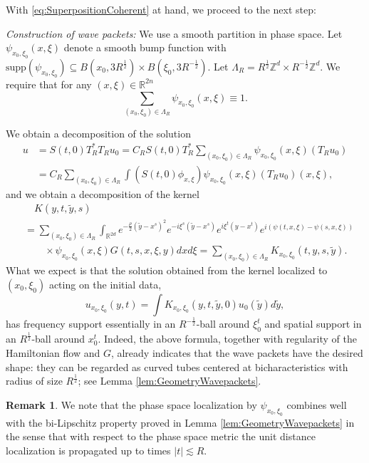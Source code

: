 \documentclass{amsart}
\theoremstyle{definition}
\newtheorem{remark}[theorem]{Remark}
\newcommand{\R}{\mathbb{R}}
\newcommand{\Z}{\mathbb{Z}}
\begin{document}
\smallskip

With \eqref{eq:SuperpositionCoherent} at hand, we proceed to the next step:

\medskip

\emph{Construction of wave packets:} We use a smooth partition in phase space. Let $\psi_{x_0,\xi_0}(x,\xi)$ denote a smooth bump function with $\text{supp}(\psi_{x_0,\xi_0}) \subseteq B(x_0,3 R^{\frac{1}{2}}) \times B(\xi_0,3 R^{-\frac{1}{2}})$.
Let $\Lambda_{R} = R^{\frac{1}{2}} \Z^d \times R^{-\frac{1}{2}} \Z^d$. We require that for any $(x,\xi) \in \R^{2n}$
\begin{equation*}
\sum_{(x_0,\xi_0) \in \Lambda_R} \psi_{x_0,\xi_0}(x,\xi) \equiv 1.
\end{equation*}

We obtain a decomposition of the solution
\begin{equation*}
\begin{split}
u &= S(t,0) T_R^* T_R u_0 = C_R S(t,0) T_R^* \sum_{(x_0,\xi_0) \in \Lambda_R} \psi_{x_0,\xi_0}(x,\xi) ( T_R u_0 ) \\
&= C_R \sum_{(x_0,\xi_0) \in \Lambda_R} \int (S(t,0) \phi_{x,\xi}) \psi_{x_0,\xi_0}(x,\xi) (T_R u_0)(x,\xi),
\end{split}
\end{equation*}
and we obtain a decomposition of the kernel
\begin{equation*}
\begin{split}
&\quad K(y,t,\tilde{y},s) \\
&= \sum_{(x_0,\xi_0) \in \Lambda_R} \int_{\R^{2d}} e^{- \frac{\rho}{2}(\tilde{y}-x^s)^2} e^{-i \xi^s (\tilde{y}-x^s)} e^{i \xi^t (y-x^t)} e^{i (\psi(t,x,\xi) - \psi(s,x,\xi))} \\
&\quad \quad \times \psi_{x_0,\xi_0}(x,\xi) G(t,s,x,\xi,y) dx d\xi = \sum_{(x_0,\xi_0) \in \Lambda_R} K_{x_0,\xi_0}(t,y,s,\tilde{y}).
\end{split}
\end{equation*}
What we expect is that the solution obtained from the kernel localized to $(x_0,\xi_0)$ acting on the initial data,
\begin{equation*}
u_{x_0,\xi_0}(y,t) = \int K_{x_0,\xi_0}(y,t,\tilde{y},0) u_0(\tilde{y}) d\tilde{y},
\end{equation*}
has frequency support essentially in an $R^{-\frac{1}{2}}$-ball around $\xi_0^t$ and spatial support in an $R^{\frac{1}{2}}$-ball around $x_0^t$. Indeed, the above formula, together with regularity of the Hamiltonian flow and $G$, already indicates that the wave packets have the desired shape: they can be regarded as curved tubes centered at bicharacteristics with radius of size $R^{\frac{1}{2}}$; see Lemma \ref{lem:GeometryWavepackets}.
\begin{remark}
We note that the phase space localization by $\psi_{x_0,\xi_0}$ combines well with the bi-Lipschitz property proved in Lemma \ref{lem:GeometryWavepackets} in the sense that with respect to the phase space metric the unit distance localization is propagated up to times $|t| \lesssim R$. 
\end{remark}
\end{document}
